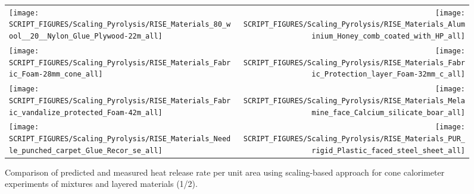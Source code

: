 \begin{figure}[!h]
\begin{tabular*}{\textwidth}{l@{\extracolsep{\fill}}r}
\texttt{[image: SCRIPT\_FIGURES/Scaling\_Pyrolysis/RISE\_Materials\_80\_wool\_\_20\_\_Nylon\_Glue\_Plywood-22m\_all]} &
\texttt{[image: SCRIPT\_FIGURES/Scaling\_Pyrolysis/RISE\_Materials\_Aluminium\_Honey\_comb\_coated\_with\_HP\_all]} \\
\texttt{[image: SCRIPT\_FIGURES/Scaling\_Pyrolysis/RISE\_Materials\_Fabric\_Foam-28mm\_cone\_all]} &
\texttt{[image: SCRIPT\_FIGURES/Scaling\_Pyrolysis/RISE\_Materials\_Fabric\_Protection\_layer\_Foam-32mm\_c\_all]} \\
\texttt{[image: SCRIPT\_FIGURES/Scaling\_Pyrolysis/RISE\_Materials\_Fabric\_vandalize\_protected\_Foam-42m\_all]} &
\texttt{[image: SCRIPT\_FIGURES/Scaling\_Pyrolysis/RISE\_Materials\_Melamine\_face\_Calcium\_silicate\_boar\_all]} \\
\texttt{[image: SCRIPT\_FIGURES/Scaling\_Pyrolysis/RISE\_Materials\_Needle\_punched\_carpet\_Glue\_Recor\_se\_all]} &
\texttt{[image: SCRIPT\_FIGURES/Scaling\_Pyrolysis/RISE\_Materials\_PUR\_rigid\_Plastic\_faced\_steel\_sheet\_all]} \\
\end{tabular*}
\caption[HRRPUA of RISE materials using scaling model, mixtures and layered materials]
{Comparison of predicted and measured heat release rate per unit area using scaling-based approach for cone calorimeter experiments of mixtures and layered materials (1/2).}
\label{RISE_Materials_mixtures1}
\end{figure}


